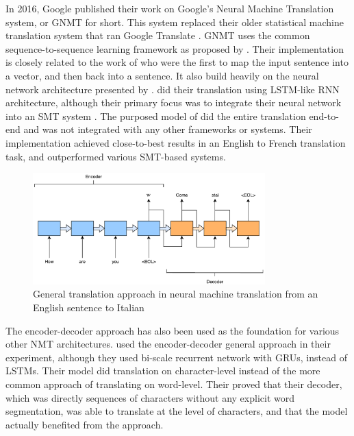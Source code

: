 In 2016, Google published their work on Google's Neural Machine Translation system, or GNMT for short. This system replaced their older statistical machine translation system that ran Google Translate \citep{turovsky2016googletranslatenmt}. GNMT uses the common sequence-to-sequence learning framework as proposed by \citep{sutskever2014sequence, wu2016google}. Their implementation is closely related to the work of \citep{kalchbrenner2013recurrent} who were the first to map the input sentence into a vector, and then back into a sentence. It also build heavily on the neural network architecture presented by \citep{cho2014learning}. \citep{cho2014learning} did their translation using LSTM-like RNN architecture, although their primary focus was to integrate their neural network into an SMT system \citep{cho2014learning, sutskever2014sequence}. The purposed model of \citep{sutskever2014sequence} did the entire translation end-to-end and was not integrated with any other frameworks or systems. Their implementation achieved close-to-best results in an English to French translation task, and outperformed various SMT-based systems.

\begin{figure}[ht]
    \centering
    \includegraphics[width=0.8\textwidth]{fig/related_work/encoder_decoder_en_it.pdf}
    \caption{General translation approach in neural machine translation from an English sentence to Italian}
    \label{fig:machine-translation-encoder-decoder-simple}
\end{figure}

The encoder-decoder approach has also been used as the foundation for various other NMT architectures. \citep{chung2016character} used the encoder-decoder general approach in their experiment, although they used bi-scale recurrent network with GRUs, instead of LSTMs. Their model did translation on character-level instead of the more common approach of translating on word-level. Their proved that their decoder, which was directly sequences of characters without any explicit word segmentation, was able to translate at the level of characters, and that the model actually benefited from the approach. 

